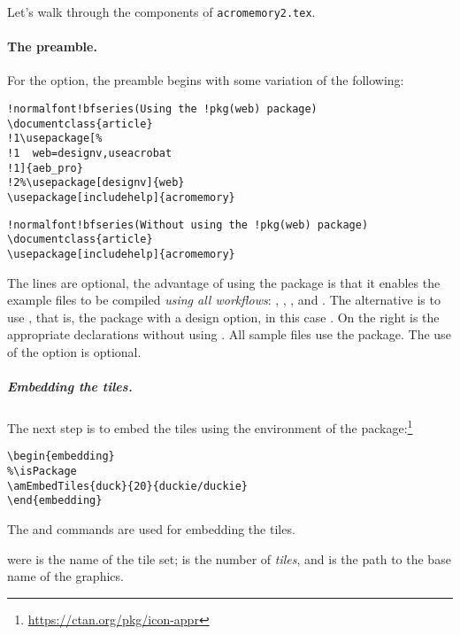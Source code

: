 \documentclass{article}
\edef\amtIndent{\the\parindent}
\begin{document}
\newtopic\noindent
Let's walk through the components of \texttt{acromemory2.tex}.

\paragraph*{The preamble.}
For the  option, the preamble begins with some variation of
the following:
\bVerb\def\1{\llap{\ding{192}\enspace}}\def\2{\llap{\ding{193}\enspace}}
\begin{minipage}[t]{.5\linewidth}
\begin{Verbatim}[fontsize=\small,commandchars=!()]
!normalfont!bfseries(Using the !pkg(web) package)
\documentclass{article}
!1\usepackage[%
!1  web=designv,useacrobat
!1]{aeb_pro}
!2%\usepackage[designv]{web}
\usepackage[includehelp]{acromemory}
\end{Verbatim}
\end{minipage}\hfill
\begin{minipage}[t]{.5\linewidth}
\begin{Verbatim}[fontsize=\small,commandchars=!()]
!normalfont!bfseries(Without using the !pkg(web) package)
\documentclass{article}
\usepackage[includehelp]{acromemory}
\end{Verbatim}
\end{minipage}
\eVerb The lines  are optional, the advantage of using the
 package is that it enables the example files to be compiled
\emph{using all workflows}: , , ,
and . The alternative is to use , that
is, the  package with a design option, in this case .
On the right is the appropriate declarations without using . All
sample files use the  package. The use of the 
option is optional.

\subparagraph*{Embedding the tiles.} The next step is to embed the tiles
using the  environment of the 
package:\footnote{\url{https://ctan.org/pkg/icon-appr}}
\begin{Verbatim}[fontsize=\small,xleftmargin=\amtIndent]
\begin{embedding}
%\isPackage
\amEmbedTiles{duck}{20}{duckie/duckie}
\end{embedding}
\end{Verbatim}
The  and  commands are used for embedding the
tiles.
\bVerb{}%
\begin{dCmd}[commandchars=!()]{\bxSize}
\isPackage
{}
\end{dCmd}
\eVerb were  is the name of the tile set;  is the
number of \emph{tiles}, and  is the path to the base name of
the graphics.
\end{document}
